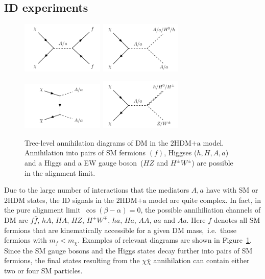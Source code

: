 \documentclass[a4paper, 11pt,notoc]{article}
\newcommand{\hdma}{\ensuremath{\textrm{2HDM+a}}\xspace}
\begin{document}
\subsection{ID experiments}

\begin{figure}[t!]
\centering
\includegraphics[width=0.35\textwidth]{graph_2hdm_relic_s_fermions.pdf} \qquad 
\includegraphics[width=0.35\textwidth]{graph_2hdm_relic_s_bosons.pdf} 

\vspace{5mm}

\includegraphics[width=0.35\textwidth]{graph_2hdm_relic_ss_bosons.pdf} \qquad 
\includegraphics[width=0.35\textwidth]{graph_2hdm_relic_s_vbosons.pdf}
\vspace{4mm}
\caption{Tree-level annihilation diagrams of DM in the \hdma model. Annihilation into pairs of SM fermions $(f)$, Higgses ($h, H,A,a$) and a Higgs and a EW gauge boson~($HZ$ and $H^\pm W^\pm$) are possible in the alignment limit.}
\label{fig:feyn_annihilation}
\end{figure}

Due to the large number of interactions that the mediators $A, a$ have with SM or 2HDM states, the ID signals in the \hdma model are quite complex. In fact, in the pure alignment limit~$\cos (\beta - \alpha) = 0$, the possible annihiliation channels of DM are $ f \bar f$, $hA$, $HA$, $HZ$,  $H^\pm W^\mp$, $ha$, $Ha$, $AA$, $aa$ and $Aa$.  Here $f$ denotes all SM fermions that are kinematically accessible for a given DM mass,~i.e.~those fermions with $m_f < m_\chi$. Examples of relevant diagrams are shown in Figure~\ref{fig:feyn_annihilation}. Since the SM gauge bosons and the Higgs states decay further into pairs of SM fermions, the final states resulting from the $\chi \bar \chi$ annihilation can contain either two or four SM particles. 
\end{document}
